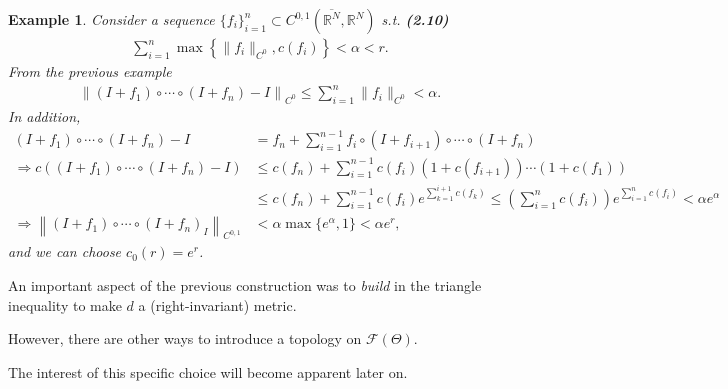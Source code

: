 \documentclass{book}
\numberwithin{equation}{section}
\newtheorem{example}{Example}[section]
\begin{document}
\begin{enumerate}
\begin{example}
        Consider a sequence $\{f_i\}_{i=1}^n\subset C^{0,1}(\overline{\mathbb{R}^N},\mathbb{R}^N)$ s.t. \textbf{(2.10)}
        \begin{align*}
            \sum_{i=1}^n \max\left\{\|f_i\|_{C^0},c(f_i)\right\} < \alpha < r.
        \end{align*}
        From the previous example
        \begin{align*}
            \left\|(I + f_1)\circ\cdots\circ(I + f_n) - I\right\|_{C^0}\le\sum_{i=1}^n \|f_i\|_{C^0} < \alpha.
        \end{align*}
        In addition,
        \begin{align*}
            (I + f_1)\circ\cdots\circ(I + f_n) - I &= f_n + \sum_{i=1}^{n-1} f_i\circ(I + f_{i+1})\circ\cdots\circ(I + f_n)\\
            \Rightarrow c\left((I + f_1)\circ\cdots\circ(I + f_n) - I\right)&\le c(f_n) + \sum_{i=1}^{n-1} c(f_i)\left(1 + c(f_{i+1})\right)\cdots\left(1 + c(f_1)\right)\\
            &\le c(f_n) + \sum_{i=1}^{n-1} c(f_i)e^{\sum_{k=1}^{i+1} c(f_k)}\le\left(\sum_{i=1}^n c(f_i)\right)e^{\sum_{i=1}^n c(f_i)} < \alpha e^\alpha\\
            \Rightarrow\left\|(I + f_1)\circ\cdots\circ(I + f_n) _ I\right\|_{C^{0,1}} &< \alpha\max\{e^\alpha,1\} < \alpha e^r,
        \end{align*}
        and we can choose $c_0(r) = e^r$.
    \end{example}
    An important aspect of the previous construction was to \textit{build} in the triangle inequality to make $d$ a (right-invariant) metric.
    
    However, there are other ways to introduce a topology on $\mathcal{F}(\Theta)$.
    
    The interest of this specific choice will become apparent later on.
    

\end{enumerate}
\end{document}
